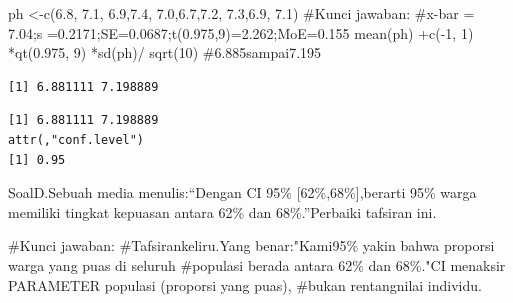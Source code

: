 \documentclass[
  indonesian,
  letterpaper,
]{book}
\newenvironment{Shaded}{\begin{snugshade}}{\end{snugshade}}
\newcommand{\CommentTok}[1]{\textcolor[rgb]{0.37,0.37,0.37}{#1}}
\newcommand{\DecValTok}[1]{\textcolor[rgb]{0.68,0.00,0.00}{#1}}
\newcommand{\FloatTok}[1]{\textcolor[rgb]{0.68,0.00,0.00}{#1}}
\newcommand{\FunctionTok}[1]{\textcolor[rgb]{0.28,0.35,0.67}{#1}}
\newcommand{\NormalTok}[1]{\textcolor[rgb]{0.00,0.23,0.31}{#1}}
\newcommand{\OtherTok}[1]{\textcolor[rgb]{0.00,0.23,0.31}{#1}}
\newcommand{\SpecialCharTok}[1]{\textcolor[rgb]{0.37,0.37,0.37}{#1}}
\begin{document}
\begin{Shaded}
\begin{Highlighting}[]
\NormalTok{ph }\OtherTok{\textless{}{-}}\FunctionTok{c}\NormalTok{(}\FloatTok{6.8}\NormalTok{, }\FloatTok{7.1}\NormalTok{, }\FloatTok{6.9}\NormalTok{,}\FloatTok{7.4}\NormalTok{, }\FloatTok{7.0}\NormalTok{,}\FloatTok{6.7}\NormalTok{,}\FloatTok{7.2}\NormalTok{, }\FloatTok{7.3}\NormalTok{,}\FloatTok{6.9}\NormalTok{, }\FloatTok{7.1}\NormalTok{)}
\CommentTok{\#Kunci jawaban:}
\CommentTok{\#x{-}bar = 7.04;s =0.2171;SE=0.0687;t(0.975,9)=2.262;MoE=0.155}
\FunctionTok{mean}\NormalTok{(ph) }\SpecialCharTok{+}\FunctionTok{c}\NormalTok{(}\SpecialCharTok{{-}}\DecValTok{1}\NormalTok{, }\DecValTok{1}\NormalTok{) }\SpecialCharTok{*}\FunctionTok{qt}\NormalTok{(}\FloatTok{0.975}\NormalTok{, }\DecValTok{9}\NormalTok{) }\SpecialCharTok{*}\FunctionTok{sd}\NormalTok{(ph)}\SpecialCharTok{/} \FunctionTok{sqrt}\NormalTok{(}\DecValTok{10}\NormalTok{) }\CommentTok{\#6.885sampai7.195}
\end{Highlighting}
\end{Shaded}

\begin{verbatim}
[1] 6.881111 7.198889
\end{verbatim}

\begin{Shaded}
\end{Shaded}

\begin{verbatim}
[1] 6.881111 7.198889
attr(,"conf.level")
[1] 0.95
\end{verbatim}

SoalD.Sebuah media menulis:``Dengan CI 95\% {[}62\%,68\%{]},berarti 95\%
warga memiliki tingkat kepuasan antara 62\% dan 68\%.''Perbaiki tafsiran
ini.

\begin{Shaded}
\begin{Highlighting}[]
\CommentTok{\#Kunci jawaban:}
\CommentTok{\#Tafsirankeliru.Yang benar:"Kami95\% yakin bahwa proporsi warga yang puas di seluruh }
\CommentTok{\#populasi berada antara 62\% dan 68\%."CI menaksir PARAMETER populasi (proporsi yang puas), }
\CommentTok{\#bukan rentangnilai individu.}
\end{Highlighting}
\end{Shaded}
\end{document}
